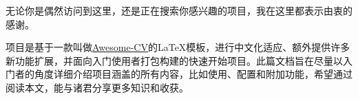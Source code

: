 \makelettertitle

\begin{cvletter}
{\hspace{2em}}无论你是偶然访问到这里，还是正在搜索你感兴趣的项目，我在这里都表示由衷的感谢。

{\hspace{2em}}{\dk}项目是基于一款叫做\hyperref{https://github.com/posquit0/Awesome-CV}{}{}{Awesome-CV}的{\LaTeX}模板，进行中文化适应、额外提供许多新功能扩展，并面向入门使用者打包构建的快速开始项目。此篇文档旨在尽量以入门者的角度详细介绍{\dk}项目涵盖的所有内容，比如使用、配置和附加功能，希望通过阅读本文，能与诸君分享更多知识和收获。
\end{cvletter}

\makeletterclosing

\clearpage
